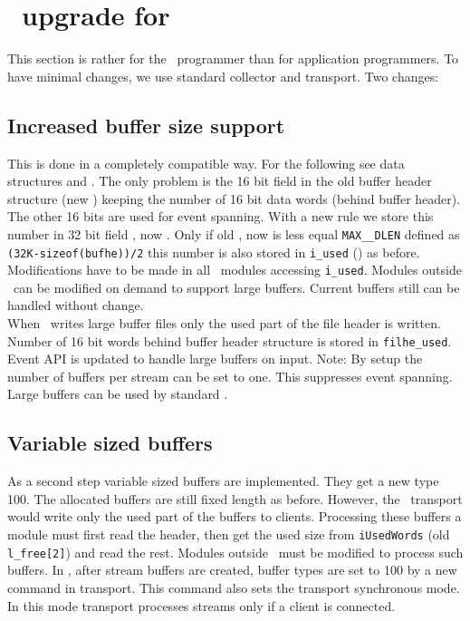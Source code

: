 \section[MBS upgrade for DABC]{\mbs\ upgrade for \dabc}
This section is rather for the \mbs\ programmer than for application programmers.
To have minimal changes, we use standard collector and transport. Two changes:
\subsection{Increased buffer size support}
This is done in a completely compatible way. 
For the following see data structures  and .
The only problem is the 16 bit  field in the old buffer header  structure (new ) keeping the number of 16 bit data words (behind buffer header). 
The other 16 bits are used for event spanning.
With a new rule we store this number in 32 bit field 
, now . Only if old , now  is less equal {\tt MAX\_\_DLEN} defined as {\tt (32K-sizeof(bufhe))/2} this number is also stored in {\tt i\_used} 
() as before. Modifications have to be made in all \mbs\ modules accessing {\tt i\_used}. Modules outside \mbs\ can be modified on demand to support large buffers. Current buffers still can be handled without change.\\
When \mbs\ writes large buffer files only the used part of the file header is written. Number of 16 bit words behind buffer header structure is stored in {\tt filhe\_used}.
Event API  is updated to handle large buffers on input.
Note: By setup the number of buffers per stream can be set to one. This suppresses event spanning.
Large buffers can be used by standard \mbs.
\subsection{Variable sized buffers}
As a second step variable sized buffers are implemented. They get a new type 100. The allocated buffers are still fixed length as before. However, the \mbs\ transport would write only the used part of the buffers to clients. Processing these buffers a module must first read the header, then get the used size from {\tt iUsedWords} (old {\tt l\_free[2]}) and read the rest. Modules outside \mbs\ must be modified to process such buffers.
In \mbs, after stream buffers are created, buffer types are set to 100 by a new command  in transport. This command also sets the transport synchronous mode. In this mode transport processes streams only if a client is connected.
